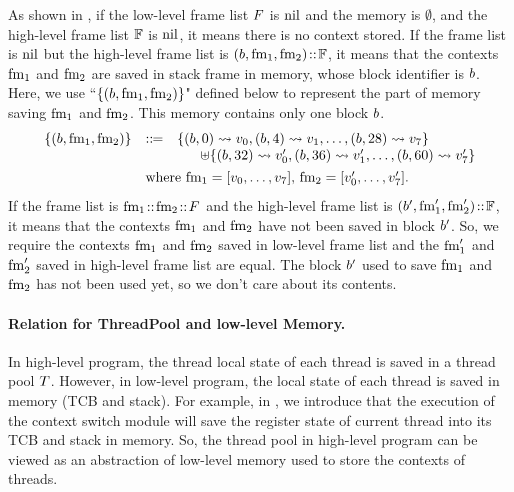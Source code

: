 As shown in \Fig{\ref{fig:relation-low-high-level-framelist}}, if 
the low-level frame list $F$ is $\text{nil}$ and the memory is $\emptyset$, 
and the high-level frame list $\mathbb{F}$ is $\text{nil}$, it means there is no 
context stored. If the frame list is $\text{nil}$ but the high-level frame list 
is $(b, \text{fm}_1, \text{fm}_2) \!::\! \mathbb{F}$, it means that the contexts 
$\text{fm}_1$ and $\text{fm}_2$ are saved in stack frame in memory, whose block identifier 
is $b$. Here, we use ``$\{ {(b, \text{fm}_1, \text{fm}_2)} \}$" defined below to 
represent the part of memory saving $\text{fm}_1$ and $\text{fm}_2$. This memory contains 
only one block $b$.  
\[
    \begin{array}{lll}
        \framMem{(\block, \fm_1, \fm_2)} & \define & 
        \{ (\block, 0) \rightsquigarrow \val_0, 
            (\block, 4) \rightsquigarrow \val_1, \dots, 
            (\block, 28) \rightsquigarrow \val_7 \} \\
        & & \quad \ \ \uplus
        \{
            (\block, 32) \rightsquigarrow \val_0', 
            (\block, 36) \rightsquigarrow \val_1', \dots,
            (\block, 60) \rightsquigarrow \val_7'   
        \} \\
        \\[-8pt]
        & 
        \multicolumn{2}{l}
        {
            \text{where} \  
            \fm_1 = \Array{\val_0, \dots, \val_7}, \,  
            \fm_2 = \Array{\val_0', \dots, \val_7'}. 
        }
    \end{array}
\]
If the frame list is $\text{fm}_1 \!::\! \text{fm}_2 \!::\! F$ 
and the high-level frame list is $(b', \text{fm}_1', \text{fm}_2') \!::\! \mathbb{F}$, 
it means that the contexts $\text{fm}_1$ and $\text{fm}_2$ have not 
been saved in block $b'$. So, we require the contexts 
$\text{fm}_1$ and $\text{fm}_2$ saved in low-level frame list and 
the $\text{fm}_1'$ and $\text{fm}_2'$ saved in high-level frame list 
are equal. The block $b'$ used to save $\text{fm}_1$ and $\text{fm}_2$ 
has not been used yet, so we don't care about its contents. 

\paragraph{\bf Relation for ThreadPool and low-level Memory.} 
In high-level program, the thread local state of each thread 
is saved in a thread pool $T$. However, in low-level 
program, the local state of each thread is saved in memory 
(TCB and stack). For example, in \Sec{\ref{sec:ctxswitch}}, 
we introduce that the execution of the context switch module
will save the register state of current thread into its 
TCB and stack in memory. So, the thread pool in high-level 
program can be viewed as an abstraction of low-level memory 
used to store the contexts of threads. 

